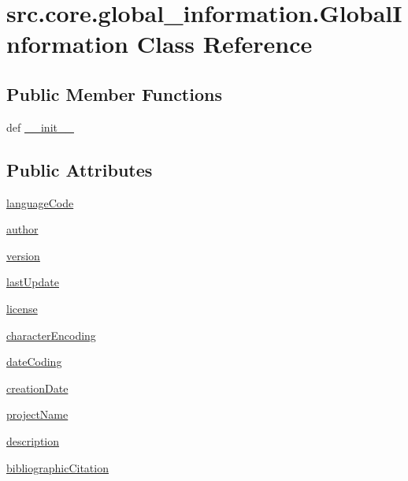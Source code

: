\hypertarget{classsrc_1_1core_1_1global__information_1_1_global_information}{\section{src.\+core.\+global\+\_\+information.\+Global\+Information Class Reference}
\label{classsrc_1_1core_1_1global__information_1_1_global_information}
}
\subsection*{Public Member Functions}
\begin{DoxyCompactItemize}
\item 
def \hyperlink{classsrc_1_1core_1_1global__information_1_1_global_information_a6538239b5662f3a2753673c7c219bfe9}{\+\_\+\+\_\+init\+\_\+\+\_\+}
\end{DoxyCompactItemize}
\subsection*{Public Attributes}
\begin{DoxyCompactItemize}
\item 
\hyperlink{classsrc_1_1core_1_1global__information_1_1_global_information_a67df050014c5e4f44cd0d34c5c97da3f}{language\+Code}
\item 
\hyperlink{classsrc_1_1core_1_1global__information_1_1_global_information_a75ba6ca3c99930f8b46906f7622c36aa}{author}
\item 
\hyperlink{classsrc_1_1core_1_1global__information_1_1_global_information_a48a0e9271d030e4d1b1f89aa7f8ecf39}{version}
\item 
\hyperlink{classsrc_1_1core_1_1global__information_1_1_global_information_a4c3c1476f39150406420455273d6dbd0}{last\+Update}
\item 
\hyperlink{classsrc_1_1core_1_1global__information_1_1_global_information_ae9146603dba3654d72081b02e68c99d7}{license}
\item 
\hyperlink{classsrc_1_1core_1_1global__information_1_1_global_information_affc1f1a49521c8d27523b47ccf7a0724}{character\+Encoding}
\item 
\hyperlink{classsrc_1_1core_1_1global__information_1_1_global_information_aaa8008762d8d3afa73ea17c110d3813b}{date\+Coding}
\item 
\hyperlink{classsrc_1_1core_1_1global__information_1_1_global_information_aa6e73ed38a7a4faf7a1d076b03e2afa7}{creation\+Date}
\item 
\hyperlink{classsrc_1_1core_1_1global__information_1_1_global_information_aa75b2e04e65ddb9d9f7f78c15d049961}{project\+Name}
\item 
\hyperlink{classsrc_1_1core_1_1global__information_1_1_global_information_ad9432db5c5b0393589658eb92a17bce3}{description}
\item 
\hyperlink{classsrc_1_1core_1_1global__information_1_1_global_information_a036b2ccf0faed59803b88f4ecb8dfc19}{bibliographic\+Citation}
\end{DoxyCompactItemize}


